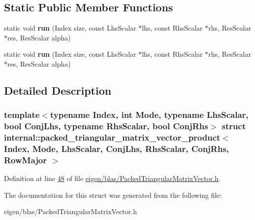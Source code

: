 \subsection*{Static Public Member Functions}
\begin{DoxyCompactItemize}
\item 
\mbox{\label{structinternal_1_1packed__triangular__matrix__vector__product_3_01_index_00_01_mode_00_01_lhs_sc27c8536a613da6e5ab28fe48015c06ef_a157346f99961d3aa8bc220fcfbbc748d}} 
static void {\bfseries run} (Index size, const Lhs\+Scalar $\ast$lhs, const Rhs\+Scalar $\ast$rhs, Res\+Scalar $\ast$res, Res\+Scalar alpha)
\item 
\mbox{\label{structinternal_1_1packed__triangular__matrix__vector__product_3_01_index_00_01_mode_00_01_lhs_sc27c8536a613da6e5ab28fe48015c06ef_a157346f99961d3aa8bc220fcfbbc748d}} 
static void {\bfseries run} (Index size, const Lhs\+Scalar $\ast$lhs, const Rhs\+Scalar $\ast$rhs, Res\+Scalar $\ast$res, Res\+Scalar alpha)
\end{DoxyCompactItemize}


\subsection{Detailed Description}
\subsubsection*{template$<$typename Index, int Mode, typename Lhs\+Scalar, bool Conj\+Lhs, typename Rhs\+Scalar, bool Conj\+Rhs$>$\newline
struct internal\+::packed\+\_\+triangular\+\_\+matrix\+\_\+vector\+\_\+product$<$ Index, Mode, Lhs\+Scalar, Conj\+Lhs, Rhs\+Scalar, Conj\+Rhs, Row\+Major $>$}



Definition at line \hyperlink{eigen_2blas_2_packed_triangular_matrix_vector_8h_source_l00048}{48} of file \hyperlink{eigen_2blas_2_packed_triangular_matrix_vector_8h_source}{eigen/blas/\+Packed\+Triangular\+Matrix\+Vector.\+h}.



The documentation for this struct was generated from the following file\+:\begin{DoxyCompactItemize}
\item 
eigen/blas/\+Packed\+Triangular\+Matrix\+Vector.\+h\end{DoxyCompactItemize}
